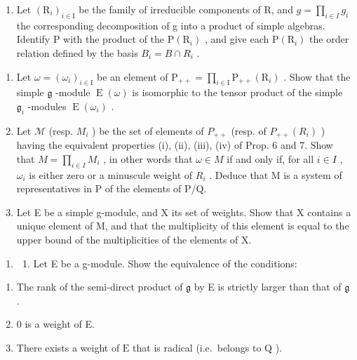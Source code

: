 \begin{enumerate}
\def\labelenumi{\arabic{enumi})}
\setcounter{enumi}{1}
\tightlist
\item
  Let \((\mathrm{R}_{i})_{i\in\mathrm{I}}\) be the family of irreducible components of R, and \(g=\prod_{i\in I}g_{i}\) the corresponding decomposition of g into a product of simple algebras. Identify P with the product of the \(\mathrm{P}(\mathrm{R}_{i})\) , and give each \(\mathrm{P}(\mathrm{R}_{i})\) the order relation defined by the basis \(B_{i}=B\cap R_{i}\) .
\end{enumerate}

\begin{enumerate}
\def\labelenumi{\alph{enumi})}
\item
  Let \(\omega = (\omega_{i})_{i\in \mathrm{I}}\) be an element of \(\mathrm{P}_{++} = \prod_{i\in \mathrm{I}}\mathrm{P}_{++}(\mathrm{R}_i)\) . Show that the simple \(\mathfrak{g}\) -module \(\operatorname {E}(\omega)\) is isomorphic to the tensor product of the simple \(\mathfrak{g}_i\) -modules \(\operatorname {E}(\omega_i)\) .
\item
  Let \(\mathcal{M}\) (resp. \(M_{i}\) ) be the set of elements of \(P_{++}\) (resp. of \(P_{++}(R_{i})\) ) having the equivalent properties (i), (ii), (iii), (iv) of Prop. 6 and 7. Show that \(M = \prod_{i \in I} M_{i}\) , in other words that \(\omega \in M\) if and only if, for all \(i \in I\) , \(\omega_{i}\) is either zero or a minuscule weight of \(R_{i}\) . Deduce that M is a system of representatives in P of the elements of P/Q.
\item
  Let E be a simple g-module, and X its set of weights. Show that X contains a unique element of M, and that the multiplicity of this element is equal to the upper bound of the multiplicities of the elements of X.
\end{enumerate}

\begin{enumerate}
\def\labelenumi{\arabic{enumi})}
\setcounter{enumi}{2}
\tightlist
\item
  \begin{enumerate}
  \def\labelenumii{\alph{enumii})}
  \tightlist
  \item
    Let E be a g-module. Show the equivalence of the conditions:
  \end{enumerate}
\end{enumerate}

\begin{enumerate}
\def\labelenumi{(\roman{enumi})}
\item
  The rank of the semi-direct product of \(\mathfrak{g}\) by E is strictly larger than that of \(\mathfrak{g}\) .
\item
  0 is a weight of E.
\item
  There exists a weight of \(\mathrm{E}\) that is radical (i.e.~belongs to \(\mathrm{Q}\) ).
\end{enumerate}

